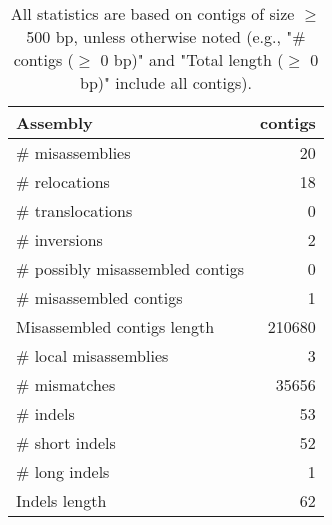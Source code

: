 \documentclass[12pt,a4paper]{article}
\begin{document}
\begin{table}[ht]
\begin{center}
\caption{All statistics are based on contigs of size $\geq$ 500 bp, unless otherwise noted (e.g., "\# contigs ($\geq$ 0 bp)" and "Total length ($\geq$ 0 bp)" include all contigs).}
\begin{tabular}{|l*{1}{|r}|}
\hline
Assembly & contigs \\ \hline
\# misassemblies & 20 \\ \hline
\hspace{5mm}\# relocations & 18 \\ \hline
\hspace{5mm}\# translocations & 0 \\ \hline
\hspace{5mm}\# inversions & 2 \\ \hline
\# possibly misassembled contigs & 0 \\ \hline
\# misassembled contigs & 1 \\ \hline
Misassembled contigs length & 210680 \\ \hline
\# local misassemblies & 3 \\ \hline
\# mismatches & 35656 \\ \hline
\# indels & 53 \\ \hline
\hspace{5mm}\# short indels & 52 \\ \hline
\hspace{5mm}\# long indels & 1 \\ \hline
Indels length & 62 \\ \hline
\end{tabular}
\end{center}
\end{table}
\end{document}
